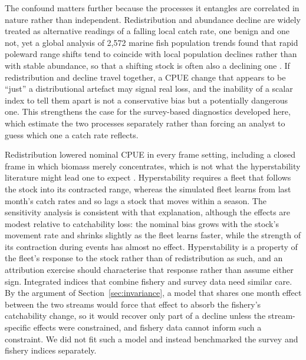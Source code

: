 \documentclass[11pt,a4paper]{article}
\begin{document}
The confound matters further because the processes it entangles are correlated in nature rather than independent. Redistribution and abundance decline are widely treated as alternative readings of a falling local catch rate, one benign and one not, yet a global analysis of 2,572 marine fish population trends found that rapid poleward range shifts tend to coincide with local population declines rather than with stable abundance, so that a shifting stock is often also a declining one \citep{chaikin2024}. If redistribution and decline travel together, a CPUE change that appears to be ``just'' a distributional artefact may signal real loss, and the inability of a scalar index to tell them apart is not a conservative bias but a potentially dangerous one. This strengthens the case for the survey-based diagnostics developed here, which estimate the two processes separately rather than forcing an analyst to guess which one a catch rate reflects.

Redistribution lowered nominal CPUE in every frame setting, including a closed frame in which biomass merely concentrates, which is not what the hyperstability literature might lead one to expect \citep{harley2001,erisman2011}. Hyperstability requires a fleet that follows the stock into its contracted range, whereas the simulated fleet learns from last month's catch rates and so lags a stock that moves within a season. The sensitivity analysis is consistent with that explanation, although the effects are modest relative to catchability loss: the nominal bias grows with the stock's movement rate and shrinks slightly as the fleet learns faster, while the strength of its contraction during events has almost no effect. Hyperstability is a property of the fleet's response to the stock rather than of redistribution as such, and an attribution exercise should characterise that response rather than assume either sign. Integrated indices that combine fishery and survey data need similar care. By the argument of Section~\ref{sec:invariance}, a model that shares one month effect between the two streams would force that effect to absorb the fishery's catchability change, so it would recover only part of a decline unless the stream-specific effects were constrained, and fishery data cannot inform such a constraint. We did not fit such a model and instead benchmarked the survey and fishery indices separately.
\end{document}

